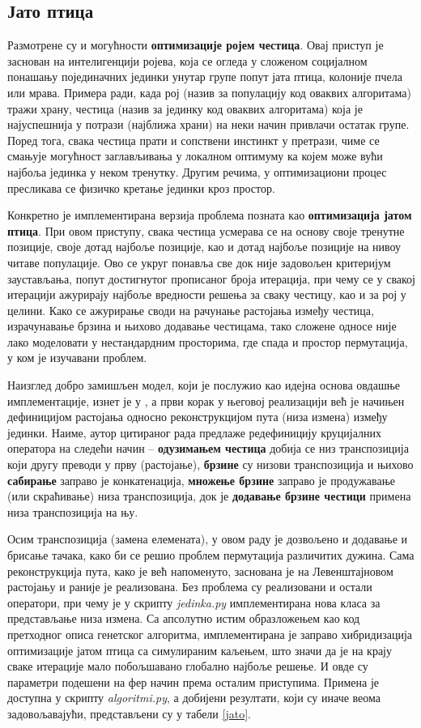 \documentclass[a4paper]{article}
\begin{document}
\subsection{Јато птица}

Размотрене су и могућности \textbf{оптимизације ројем честица}. Овај приступ је заснован на интелигенцији ројева, која се огледа у сложеном социјалном понашању појединачних јединки унутар групе попут јата птица, колоније пчела или мрава. Примера ради, када рој (назив за популацију код оваквих алгоритама) тражи храну, честица (назив за јединку код оваквих алгоритама) која је најуспешнија у потрази (најближа храни) на неки начин привлачи остатак групе. Поред тога, свака честица прати и сопствени инстинкт у претрази, чиме се смањује могућност заглављивања у локалном оптимуму ка којем може вући најбоља јединка у неком тренутку. Другим речима, у оптимизациони процес пресликава се физичко кретање јединки кроз простор.

Конкретно је имплементирана верзија проблема позната као \textbf{оптимизација јатом птица}. При овом приступу, свака честица усмерава се на основу своје тренутне позиције, своје дотад најбоље позиције, као и дотад најбоље позиције на нивоу читаве популације. Ово се укруг понавља све док није задовољен критеријум заустављања, попут достигнутог прописаног броја итерација, при чему се у свакој итерацији ажурирају најбоље вредности решења за сваку честицу, као и за рој у целини. Како се ажурирање своди на рачунање растојања између честица, израчунавање брзина и њихово додавање честицама, тако сложене односе није лако моделовати у нестандардним просторима, где спада и простор пермутација, у ком је изучавани проблем.

Наизглед добро замишљен модел, који је послужио као идејна основа овдашње имплементације, изнет је у \cite{clerc}, а први корак у његовој реализацији већ је начињен дефиницијом растојања односно реконструкцијом пута (низа измена) између јединки. Наиме, аутор цитираног рада предлаже редефиницију круцијалних оператора на следећи начин -- \textbf{одузимањем честица} добија се низ транспозиција који другу преводи у прву (растојање), \textbf{брзине} су низови транспозиција и њихово \textbf{сабирање} заправо је конкатенација, \textbf{множење брзине} заправо је продужавање (или скраћивање) низа транспозиција, док је \textbf{додавање брзине честици} примена низа транспозиција на њу.

Осим транспозиција (замена елемената), у овом раду је дозвољено и додавање и брисање тачака, како би се решио проблем пермутација различитих дужина. Сама реконструкција пута, како је већ напоменуто, заснована је на Левенштајновом растојању и раније је реализована. Без проблема су реализовани и остали оператори, при чему је у скрипту \textit{jedinka.py} имплементирана нова класа за представљање низа измена. Са апсолутно истим образложењем као код претходног описа генетског алгоритма, имплементирана је заправо хибридизација оптимизације јатом птица са симулираним каљењем, што значи да је на крају сваке итерације мало побољшавано глобално најбоље решење. И овде су параметри подешени на фер начин према осталим приступима. Примена је доступна у скрипту \textit{algoritmi.py}, а добијени резултати, који су иначе веома задовољавајући, представљени су у табели \ref{jato}.
\end{document}
